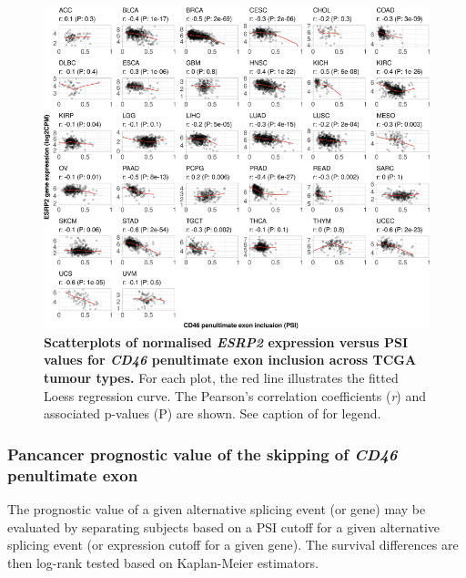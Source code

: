 \begin{figure}[!ht]
  \includegraphics[width=1\textwidth]{images/psichomics/10-tcga-esrp2}
  \centering
  \caption[\emph{ESRP2} expression versus \emph{CD46} penultimate exon PSI in TCGA]{\textbf{Scatterplots of normalised \emph{ESRP2} expression versus PSI values for \emph{CD46} penultimate exon inclusion across TCGA tumour types.} For each plot, the red line illustrates the fitted Loess regression curve. The Pearson’s correlation coefficients (\emph{r}) and associated p-values (P) are shown. See caption of  for legend.}
  \label{fig:psichomics-tcga-esrp2}
\end{figure}

\subsubsection{Pancancer prognostic value of the skipping of \emph{CD46} penultimate exon}

The prognostic value of a given alternative splicing event (or gene) may be evaluated by separating subjects based on a PSI cutoff for a given alternative splicing event (or expression cutoff for a given gene). The survival differences are then log-rank tested based on Kaplan-Meier estimators.

